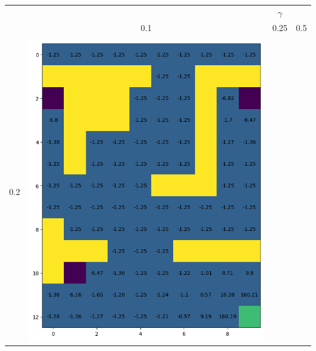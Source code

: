 \documentclass[12pt,a4paper]{report}
\begin{document}
\begin{landscape}
\begin{center}
\begin{tabular}{c || c  c  c}
    \end{tabular}        
\end{center}

\begin{center}
    \begin{tabular}{c || c  c  c}
        & & $\gamma$ & \\
        & 0.1 & 0.25 & 0.5 \\
        \hline \hline \\
        0.2 & 
            \includegraphics[width=0.35\textheight]{assets/dp/analysis/prob_0.1_gamma_0.2_value.png}
        & 

\end{tabular}
\end{center}
\end{landscape}
\end{document}
